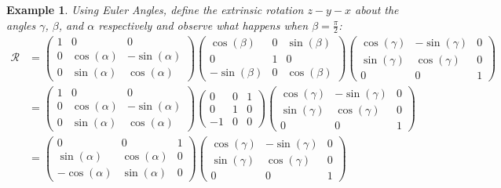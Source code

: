 \documentclass[12pt, letterpaper, onecolumn, conference, final]{IEEEtran}
\theoremstyle{definition}
\theoremstyle{plain}
\newtheorem{example}{Example}
\begin{document}
\begin{example}
Using Euler Angles, define the extrinsic rotation $z-y-x$ about the angles $\gamma$, $\beta$, and $\alpha$ respectively and observe what happens when $\beta = \frac{\pi}{2}$:
\begin{equation*}
\begin{split}
\mathcal{R} &= \begin{pmatrix}
1 & 0 & 0 \\
0 & \cos(\alpha) & -\sin(\alpha) \\
0 & \sin(\alpha) & \cos(\alpha)
\end{pmatrix} \begin{pmatrix}
\cos(\beta) & 0 & \sin(\beta) \\
0 & 1 & 0 \\
-\sin(\beta) & 0 & \cos(\beta)
\end{pmatrix} \begin{pmatrix}
\cos(\gamma) & -\sin(\gamma) & 0 \\
\sin(\gamma) & \cos(\gamma) & 0 \\
0 & 0 & 1
\end{pmatrix} \\
&= \begin{pmatrix}
1 & 0 & 0 \\
0 & \cos(\alpha) & -\sin(\alpha) \\
0 & \sin(\alpha) & \cos(\alpha)
\end{pmatrix} \begin{pmatrix}
0 & 0 & 1 \\
0 & 1 & 0 \\
-1 & 0 & 0
\end{pmatrix} \begin{pmatrix}
\cos(\gamma) & -\sin(\gamma) & 0 \\
\sin(\gamma) & \cos(\gamma) & 0 \\
0 & 0 & 1
\end{pmatrix} \\
&= \begin{pmatrix}
0 & 0 & 1 \\
\sin(\alpha) & \cos(\alpha) & 0 \\
-\cos(\alpha) & \sin(\alpha) & 0
\end{pmatrix} \begin{pmatrix}
\cos(\gamma) & -\sin(\gamma) & 0 \\
\sin(\gamma) & \cos(\gamma) & 0 \\
0 & 0 & 1
\end{pmatrix} \\

\end{split}
\end{equation*}
\end{example}
\end{document}
